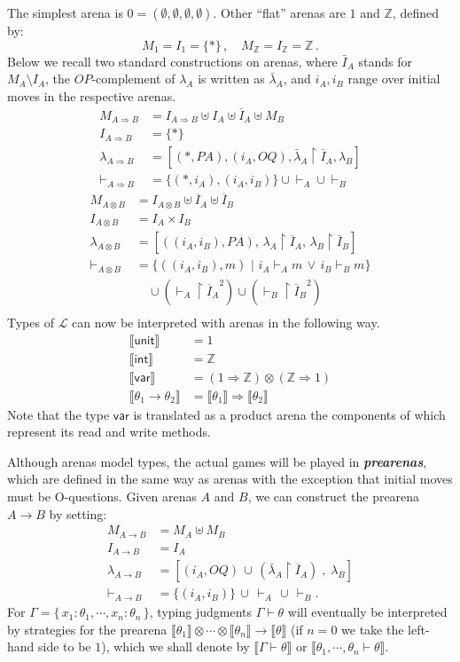 \documentclass{CSML}
\theoremstyle{definition}\newtheorem{definition}[thm]{Definition}
\theoremstyle{definition}\newtheorem{example}[thm]{Example}
\theoremstyle{definition}\newtheorem{proposition}[thm]{Proposition}
\theoremstyle{definition}\newtheorem{lemma}[thm]{Lemma}
\theoremstyle{definition}\newtheorem{theorem}[thm]{Theorem}
\theoremstyle{definition}\newtheorem{corollary}[thm]{Corollary}
\theoremstyle{definition}\newtheorem{remark}[thm]{Remark}
\newcommand\arr{\rightarrow}
\newcommand\Arr{\Rightarrow}
\newcommand\boldemph[1]{\emph{\textbf{#1}}}
\newcommand{\BI}[1]{\overline{I}_{#1}}
\newcommand{\impl}{\mathbin{\Rightarrow}}
\newcommand\Z{\mathbb{Z}}
\newcommand\comt{\mathsf{unit}}
\newcommand\expt{\mathsf{int}}
\newcommand\vart{\mathsf{var}}
\newcommand\makeset[1]{\{\,#1\,\}}
\newcommand\proj[2]{{#1\restriction#2}}
\newcommand\sem[1]{\llbracket #1 \rrbracket}
\newcommand\seq[2]{{#1} \vdash {#2}}
\begin{document}
The simplest arena is $0=(\emptyset,\emptyset,\emptyset,\emptyset)$.
Other ``flat'' arenas are $1$ and $\Z$, defined by:
\[
M_{1}=I_{1}=\{*\}\,,\quad 
M_{\Z}=I_{\Z}=\Z\,.
\]
Below we recall two standard constructions on arenas, 
where $\bar{I}_A$ stands for $M_A\setminus I_A$,
the $OP$-complement of $\lambda_A$ is written as $\bar{\lambda}_A$, and $i_A, i_B$ range
over initial moves in the respective arenas.
\[
\begin{aligned}
M_{A\impl B}   &= I_{A\impl B}\uplus I_A \uplus \BI{A} \uplus M_B\\
I_{A\impl B}   &= \{*\} \\
\lambda_{A\impl B} &= [(*,{PA}),(i_A,{OQ}),\proj{\bar{\lambda}_A}{\BI{A}},\lambda_B] \\
\vdash_{A\impl B} &= \{(*,i_A),(i_A,i_B)\} \cup{}\vdash_A{}\cup{}\vdash_B
\end{aligned}
\]
\bigskip
\[
\begin{aligned}
M_{A\otimes B}   &= I_{A\otimes B}\uplus \BI{A} \uplus \BI{B}\\
I_{A\otimes B}   &= I_A \times I_B \\
\lambda_{A\otimes B} &= [((i_A,i_B),{PA}),\, \proj{\lambda_A}{\BI{A}},\,\proj{\lambda_B}{\BI{B}}] \\
\vdash_{A\otimes B} &= \{((i_A,i_B),m)\,\,|\,\, i_A\vdash_A m\,\lor\, i_B\vdash_B m\}\\
&\quad\cup(\proj{\vdash_A}{\BI{A}}^2)\cup(\proj{\vdash_B}{\BI{B}}^2)\\
\end{aligned}
\]
Types of $\mathcal{L}$ can now be interpreted with arenas in the following way.
\begin{align*}
\sem{\comt} &= 1\\
\sem{\expt} &=\Z\\
\sem{\vart} &=(1\Arr\Z)\otimes(\Z\Arr1)\\
\sem{\theta_1\arr\theta_2} &=\sem{\theta_1}\impl \sem{\theta_2}
\end{align*}
Note that the type $\vart$ is translated as a product arena the components of which represent its read and write methods.

Although arenas model types, the actual games will be played in \boldemph{prearenas},
which are defined in the same way as arenas with the exception that initial moves must
be O-questions. Given arenas $A$ and  $B$, we can construct the prearena $A\arr B$ by setting:
\[
\begin{aligned}
M_{A\arr B} &= M_A \uplus M_B\\
I_{A\arr B}&= I_A\\
\lambda_{A\arr B}&= [(i_A, OQ)\,\cup\, (\proj{\bar{\lambda}_A}{\BI{A}}) \;,\; \lambda_B]\\
\vdash_{A\arr B}&= \{(i_A,i_B)\}\,\cup\,\vdash_A\,\cup\,\vdash_B.
\end{aligned}
\]
For $\Gamma=\makeset{x_1:\theta_1,\cdots,x_n:\theta_n}$, typing judgments $\seq{\Gamma}{\theta}$ will eventually be interpreted by strategies for the prearena
$\sem{\theta_1}\otimes\cdots\otimes\sem{\theta_n}\arr \sem{\theta}$ (if $n=0$ we take the left-hand side to be $1$),
which we shall denote by $\sem{\seq{\Gamma}{\theta}}$ or $\sem{\seq{\theta_1,\cdots,\theta_n}{\theta}}$.
\end{document}
